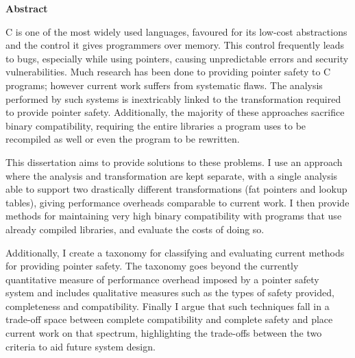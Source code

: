 \documentclass[a4paper,12pt,twoside,openright]{report}
\begin{document}
\pagestyle{empty}
\singlespacing

\onehalfspacing

\singlespacing
\newpage
{\Huge \bf Abstract}
\vspace{24pt} 

C is one of the most widely used languages, favoured for its low-cost abstractions and the control it gives programmers over memory.
This control frequently leads to bugs, especially while using pointers, causing unpredictable errors and security vulnerabilities.
Much research has been done to providing pointer safety to C programs; however current work suffers from systematic flaws.
The analysis performed by such systems is inextricably linked to the transformation required to provide pointer safety.
Additionally, the majority of these approaches sacrifice binary compatibility, requiring the entire libraries a program uses to be recompiled as well or even the program to be rewritten.

This dissertation aims to provide solutions to these problems.
I use an approach where the analysis and transformation are kept separate, with a single analysis able to support two drastically different transformations (fat pointers and lookup tables), giving performance overheads comparable to current work.
I then provide methods for maintaining very high binary compatibility with programs that use already compiled libraries, and evaluate the costs of doing so.

Additionally, I create a taxonomy for classifying and evaluating current methods for providing pointer safety.
The taxonomy goes beyond the currently quantitative measure of performance overhead imposed by a pointer safety system and includes qualitative measures such as the types of safety provided, completeness and compatibility.
Finally I argue that such techniques fall in a trade-off space between complete compatibility and complete safety and place current work on that spectrum, highlighting the trade-offs between the two criteria to aid future system design.

\newpage
\vspace*{\fill}

\setcounter{page}{0}
\pagestyle{plain}
\tableofcontents
\listoffigures
\listoftables
\end{document}
